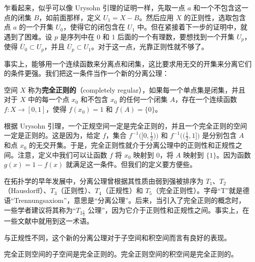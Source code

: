 乍看起来，似乎可以像 Urysohn 引理的证明一样，先取一点 $a$ 和一个不包含这一点的闭集 $B$，如前面那样，定义 $U_{1}=X-B$。然后应用 $X$ 的正则性，选取包含点 $a$ 的一个开集 $U_{0}$，使得它的闭包含在 $U_{1}$ 中。但在紧接着下一步的证明中，就遇到了困难。设 $p$ 是序列中在 $0$ 和 $1$ 后面的一个有理数，要想找到一个开集 $U_{p}$，使得 $\overline{U}_{0}\subset U_{p}$，并且 $\overline{U}_{p}\subset U_{1}$。对于这一点，光靠正则性就不够了。

事实上，能够用一个连续函数来分离点和闭集，这比要求用无交的开集来分离它们的条件更强。我们把这一条件当作一个新的分离公理：

\begin{definition}\label{definition:ch04-completely-regular}
空间 $X$ 称为\textbf{完全正则的}（completely regular），如果每一个单点集是闭集，并且对于 $X$ 中的每一个点 $x_{0}$ 和不包含 $x_{0}$ 的任何一个闭集 $A$，存在一个连续函数 $f\colon X\to[0,1]$，使得 $f(x_{0})=1$ 和 $f(A)=\{0\}$。
\end{definition}

根据 Urysohn 引理，一个正规空间一定是完全正则的，并且一个完全正则的空间一定是正则的。这是因为，给定 $f$，集合 $f^{-1}\big([0,\frac{1}{2})\big)$ 和 $f^{-1}\big((\frac{1}{2},1]\big)$ 是分别包含 $A$ 和点 $x_{0}$ 的无交开集。于是，完全正则性就介于分离公理中的正则性和正规性之间。注意，定义中我们可以让函数 $f$ 将 $x_{0}$ 映射到 $0$，将 $A$ 映射到 $\{1\}$。因为函数 $g(x)=1-f(x)$ 就满足这一条件。但我们的定义要方便些。

在拓扑学的早年发展中，分离公理曾根据其性质由弱到强被排序为 $T_{1}$、$T_{2}$（Hausdorff）、$T_{3}$（正则性）、$T_{4}$（正规性）和 $T_{5}$（完全正则性）。字母``T''就是德语``Trennungsaxiom''，意思是``分离公理''。后来，当引入了完全正则的概念时，一些学者建议将其称为``$T_{3\frac{1}{2}}$ 公理''，因为它介于正则性和正规性之间。事实上，在一些文献中就用到这一术语。

与正规性不同，这个新的分离公理对于子空间和积空间而言有良好的表现。

\begin{theorem}\label{theorem:ch04-completely-regular-hereditary}
完全正则空间的子空间是完全正则的。完全正则空间的积空间是完全正则的。
\end{theorem}

